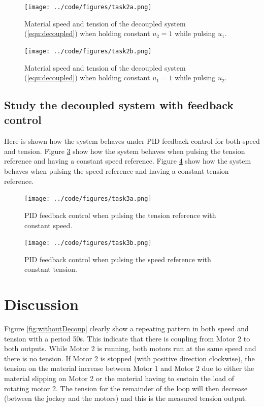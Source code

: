 \documentclass[a4paper, titlepage]{article}
\begin{document}
\begin{figure}[H]
\center
\texttt{[image: ../code/figures/task2a.png]}
\caption{Material speed and tension of the decoupled system (\ref{equ:decoupled}) when holding constant $u_2 = 1$ while pulsing $u_1$.}
\label{fig:withDecoupSpeedA}
\end{figure}

\begin{figure}[H]
\center
\texttt{[image: ../code/figures/task2b.png]}
\caption{Material speed and tension of the decoupled system (\ref{equ:decoupled}) when holding constant $u_1 = 1$ while pulsing $u_2$.}
\label{fig:withDecoupSpeedB}
\end{figure}


\subsection{Study the decoupled system with feedback control}
Here is shown how the system behaves under PID feedback control for both speed and tension.
Figure \ref{fig:withFeedbackDecoupSpeedA} show how the system behaves when pulsing the tension reference and having a constant speed reference.
Figure \ref{fig:withFeedbackDecoupSpeedB} show how the system behaves when pulsing the speed reference and having a constant tension reference.

\begin{figure}[H]
\center
\texttt{[image: ../code/figures/task3a.png]}
\caption{PID feedback control when pulsing the tension reference with constant speed.}
\label{fig:withFeedbackDecoupSpeedA}
\end{figure}

\begin{figure}[H]
\center
\texttt{[image: ../code/figures/task3b.png]}
\caption{PID feedback control when pulsing the speed reference with constant tension.}
\label{fig:withFeedbackDecoupSpeedB}
\end{figure}


\section{Discussion}
Figure \ref{fig:withoutDecoup} clearly show a repeating pattern in both speed and tension with a period 50s.
This indicate that there is coupling from Motor 2 to both outputs.
While Motor 2 is running, both motors run at the same speed and there is no tension.
If Motor 2 is stopped (with positive direction clockwise), the tension on the material increase between Motor 1 and Motor 2 due to either the material slipping on Motor 2 or the material having to sustain the load of rotating motor 2.
The tension for the remainder of the loop will then decrease (between the jockey and the motors) and this is the measured tension output.
\end{document}
